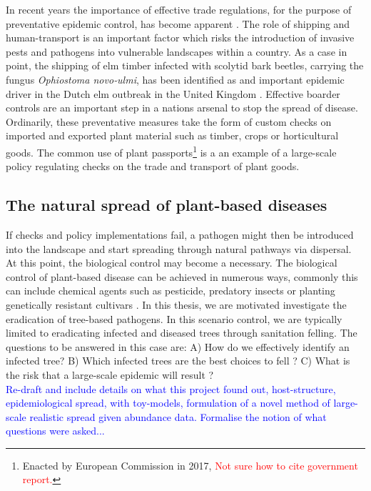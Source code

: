 In recent years the importance of effective trade regulations, for the purpose of preventative epidemic control, has become apparent \cite{rodoni2009role}. The role of shipping and human-transport is an important factor which risks the introduction of invasive pests and pathogens into vulnerable landscapes within a country. As a case in point, the shipping of elm timber infected with scolytid bark beetles, carrying the fungus \textit{Ophiostoma novo‐ulmi}, has been identified as and important epidemic driver in the Dutch elm outbreak in the United Kingdom \cite{doi:10.1111/j.1365-3059.2010.02391.x}. Effective boarder controls are an important step in a nations arsenal to stop the spread of disease. Ordinarily, these preventative measures take the form of custom checks on imported and exported plant material such as timber, crops or horticultural goods. The common use of plant passports\footnote{Enacted by European Commission in 2017, \textcolor{red}{Not sure how to cite government report.}} is a an example of a large-scale policy regulating checks on the trade and transport of plant goods. 

\subsection{The natural spread of plant-based diseases}
If checks and policy implementations fail, a pathogen might then be introduced into the landscape and start spreading through natural pathways via dispersal. At this point, the biological control may become a necessary. The biological control of plant-based disease can be achieved in numerous ways, commonly this can include chemical agents such as pesticide, predatory insects or planting genetically resistant cultivars \cite{pal2006biological, baker1974biological}. In this thesis, we are motivated investigate the eradication of tree-based pathogens. In this scenario control, we are typically limited to eradicating infected and diseased trees through sanitation felling. The questions to be answered in this case are: A) How do we effectively identify an infected tree? B) Which infected trees are the best choices to fell ? C) What is the risk that a large-scale epidemic will result ?\\

\textcolor{blue}{Re-draft and include details on what this project found out, host-structure, epidemiological spread, with toy-models, formulation of a novel method of large-scale realistic spread given abundance data. Formalise the notion of what questions were asked...}

